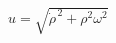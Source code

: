 \documentclass[border=2.5pt]{standalone}
\begin{document}
$\displaystyle u=\sqrt{\dot\rho^{\,2}+\rho^2\omega^2}$
\end{document}

